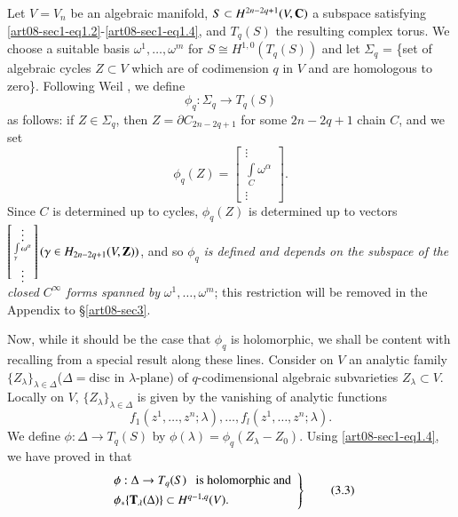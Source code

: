Let $V=V_{n}$ be an algebraic manifold, $S\subset H^{2n-2q+1}(V,\mathbf{C})$ a subspace satisfying \eqref{art08-sec1-eq1.2}-\eqref{art08-sec1-eq1.4}, and $T_{q}(S)$ the resulting complex torus. We choose a suitable basis $\omega^{1},\ldots,\omega^{m}$ for $S\cong H^{1,0}(T_{q}(S))$ and let $\Sigma_{q}$ = \{set of algebraic cycles $Z\subset V$ which are of codimension $q$ in $V$ and are homologous to zero\}. Following Weil \cite{art08-key22}, we define
\begin{equation*}
\phi_{q}:\Sigma_{q}\to T_{q}(S)\tag{3.1}\label{art08-sec3-eq3.1}
\end{equation*}
as follows: if $Z\in \Sigma_{q}$, then $Z=\partial C_{2n-2q+1}$ for some $2n-2q+1$ chain $C$, and we set 
\begin{equation*}
\phi_{q}(Z)=
\begin{bmatrix}
\vdots\\
\int\limits_{C}\omega^{\alpha}\\
\vdots
\end{bmatrix}.\tag{3.2}\label{art08-sec3-eq3.2}
\end{equation*}\pageoriginale
Since $C$ is determined up to cycles, $\phi_{q}(Z)$ is determined up to vectors $\left[\begin{smallmatrix}\vdots\\ \int\limits_{\gamma}\omega^{\alpha}\\ \vdots\end{smallmatrix}\right](\gamma\in H_{2n-2q+1}(V,\mathbf{Z}))$, and so $\phi_{q}$ {\em is defined and depends on the subspace of the closed $C^{\infty}$ forms spanned by} $\omega^{1},\ldots,\omega^{m}$; this restriction will be removed in the Appendix to \S\ref{art08-sec3}.

Now, while it should be the case that $\phi_{q}$ is holomorphic, we shall be content with recalling from \cite{art08-key9} a special result along these lines. Consider on $V$ an analytic family $\{Z_{\lambda}\}_{\lambda\in \Delta}$($\Delta=\text{disc in~}\lambda\text{-plane}$) of $q$-codimensional algebraic subvarieties $Z_{\lambda}\subset V$. Locally on $V$, $\{Z_{\lambda}\}_{\lambda\in \Delta}$ is given by the vanishing of analytic functions 
$$
f_{1}(z^{1},\ldots,z^{n};\lambda),\ldots,f_{l}(z^{1},\ldots,z^{n};\lambda).
$$ 
We define $\phi:\Delta\to T_{q}(S)$ by $\phi(\lambda)=\phi_{q}(Z_{\lambda}-Z_{0})$. Using  \eqref{art08-sec1-eq1.4}, we have proved in \cite{art08-key9} that
\begin{equation*}
\left.
\begin{array}{l}
\phi :\Delta\to T_{q}(S)\text{~~ is holomorphic and}\\[4pt]
\phi_{*}\{\mathbf{T}_{\lambda}(\Delta)\}\subset H^{q-1,q}(V).
\end{array}\right\}\tag{3.3}\label{art08-sec3-eq3.3}
\end{equation*}

